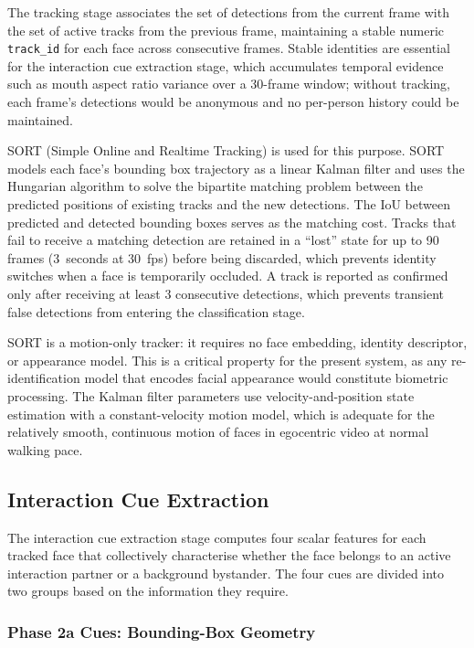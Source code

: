 The tracking stage associates the set of detections from the current frame with the set
of active tracks from the previous frame, maintaining a stable numeric \texttt{track\_id}
for each face across consecutive frames. Stable identities are essential for the
interaction cue extraction stage, which accumulates temporal evidence such as mouth
aspect ratio variance over a 30-frame window; without tracking, each frame's detections
would be anonymous and no per-person history could be maintained.

SORT (Simple Online and Realtime Tracking) \cite{sort2016} is used for this purpose. SORT
models each face's bounding box trajectory as a linear Kalman filter and uses the
Hungarian algorithm to solve the bipartite matching problem between the predicted
positions of existing tracks and the new detections. The IoU between predicted and
detected bounding boxes serves as the matching cost. Tracks that fail to receive a
matching detection are retained in a ``lost'' state for up to 90 frames (3~seconds at
30~fps) before being discarded, which prevents identity switches when a face is
temporarily occluded. A track is reported as confirmed only after receiving at least 3
consecutive detections, which prevents transient false detections from entering the
classification stage.

SORT is a motion-only tracker: it requires no face embedding, identity descriptor, or
appearance model. This is a critical property for the present system, as any
re-identification model that encodes facial appearance would constitute biometric
processing. The Kalman filter parameters use velocity-and-position state estimation with
a constant-velocity motion model, which is adequate for the relatively smooth,
continuous motion of faces in egocentric video at normal walking pace.

\subsection{Interaction Cue Extraction}

The interaction cue extraction stage computes four scalar features for each tracked face
that collectively characterise whether the face belongs to an active interaction partner
or a background bystander. The four cues are divided into two groups based on the
information they require.

\subsubsection*{Phase 2a Cues: Bounding-Box Geometry}

